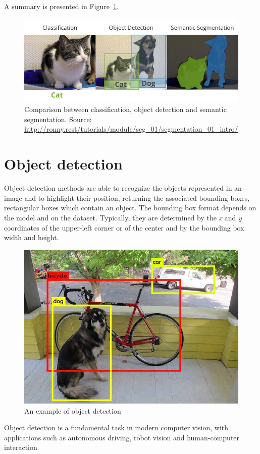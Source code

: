\documentclass[%
    corpo=12pt,
    twoside,
    stile=classica,   
    tipotesi=magistrale,
    evenboxes,
    english,
	numerazioneromana,
]{toptesi}
\begin{document}
A summary is presented in Figure~\ref{fig:classdetseg}.

\begin{figure}
	\centering
	\includegraphics[width=.8\textwidth]{imgs/classification_detection_segmentaion.jpeg}
	\caption[Comparison between classification, object detection and semantic segmentation]{Comparison between classification, object detection and semantic segmentation. Source: \url{http://ronny.rest/tutorials/module/seg_01/segmentation_01_intro/}}
	\label{fig:classdetseg}
\end{figure}

\section{Object detection}\label{sec:detection}
Object detection methods are able to recognize the objects represented in an image and to highlight their position, returning the associated bounding boxes, rectangular boxes which contain an object. The bounding box format depends on the model and on the dataset. Typically, they are determined by the \textit{x} and \textit{y} coordinates of the upper-left corner
or of the center
and by the bounding box width and height.

\begin{figure}[ht]
	\centering
	\includegraphics[width=.5\textwidth]{imgs/yolo_detection.png}
	\caption{An example of object detection\cite{redmon2016look}}
\end{figure}

Object detection is a fundamental task in modern computer vision, with applications such as autonomous driving, robot vision and human-computer interaction.
\end{document}
